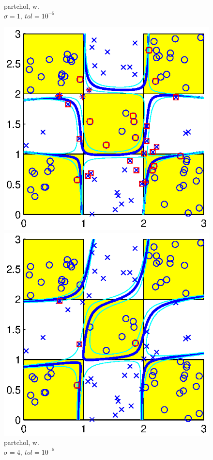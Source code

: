 \documentclass[11pt,a4paper]{article}
\theoremstyle{definition}
\begin{document}
\begin{figure}[htbp]
\begin{minipage}[t]{0.24\linewidth}
          \caption{\label{Fig:ex2_2}\textsf{partchol}, w.\protect\\$\sigma=1,~tol=10^{-5}$}
        \end{minipage}
        \begin{minipage}[t]{0.24\linewidth}
          \centering
          \includegraphics[width=1\textwidth]{2_3x3_pchol_sigma4.eps}
          \caption{\label{Fig:ex2_3}\textsf{partchol}, w.\protect\\$\sigma=4,~tol=10^{-5}$}
        \end{minipage}
        \begin{minipage}[t]{0.24\linewidth}
          \centering
          \includegraphics[width=1\textwidth]{2_3x3_pchol_tol10-2.eps}

\end{minipage}
\end{figure}
\end{document}
